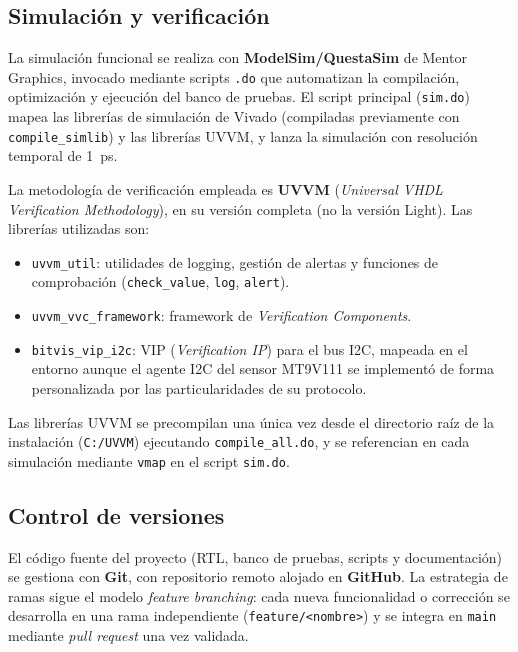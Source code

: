 \documentclass[../main.tex]{subfiles}
\begin{document}
\subsection{Simulación y verificación}
 
La simulación funcional se realiza con \textbf{ModelSim/QuestaSim} de Mentor Graphics, invocado mediante scripts \texttt{.do} que automatizan la compilación, optimización y ejecución del banco de pruebas. El script principal (\texttt{sim.do}) mapea las librerías de simulación de Vivado (compiladas previamente con \texttt{compile\_simlib}) y las librerías UVVM, y lanza la simulación con resolución temporal de 1~ps.
 
La metodología de verificación empleada es \textbf{UVVM} (\textit{Universal VHDL Verification Methodology}), en su versión completa (no la versión Light). Las librerías utilizadas son:
 
\begin{itemize}
    \item \texttt{uvvm\_util}: utilidades de logging, gestión de alertas y funciones de comprobación (\texttt{check\_value}, \texttt{log}, \texttt{alert}).
    \item \texttt{uvvm\_vvc\_framework}: framework de \textit{Verification Components}.
    \item \texttt{bitvis\_vip\_i2c}: VIP (\textit{Verification IP}) para el bus I2C, mapeada en el entorno aunque el agente I2C del sensor MT9V111 se implementó de forma personalizada por las particularidades de su protocolo.
\end{itemize}
 
Las librerías UVVM se precompilan una única vez desde el directorio raíz de la instalación (\texttt{C:/UVVM}) ejecutando \texttt{compile\_all.do}, y se referencian en cada simulación mediante \texttt{vmap} en el script \texttt{sim.do}.
 
\subsection{Control de versiones}
 
El código fuente del proyecto (RTL, banco de pruebas, scripts y documentación) se gestiona con \textbf{Git}, con repositorio remoto alojado en \textbf{GitHub}. La estrategia de ramas sigue el modelo \textit{feature branching}: cada nueva funcionalidad o corrección se desarrolla en una rama independiente (\texttt{feature/<nombre>}) y se integra en \texttt{main} mediante \textit{pull request} una vez validada.
 
\end{document}
